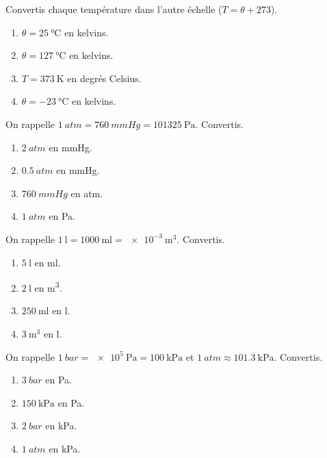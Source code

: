 \documentclass[11pt,a4paper]{article}
\begin{document}
\begin{exo}
Convertis chaque température dans l'autre échelle ($T=\theta+273$).
\begin{enumerate}[label=\alph*)]
  \item $\theta=\qty{25}{\degreeCelsius}$ en kelvins.
  \item $\theta=\qty{127}{\degreeCelsius}$ en kelvins.
  \item $T=\qty{373}{\kelvin}$ en degrés Celsius.
  \item $\theta=\qty{-23}{\degreeCelsius}$ en kelvins.
\end{enumerate}
\end{exo}

\begin{exo}
On rappelle $\qty{1}{atm}=\qty{760}{mmHg}=\qty{101325}{\pascal}$. Convertis.
\begin{enumerate}[label=\alph*)]
  \item $\qty{2}{atm}$ en \si{mmHg}.
  \item $\qty{0.5}{atm}$ en \si{mmHg}.
  \item $\qty{760}{mmHg}$ en \si{atm}.
  \item $\qty{1}{atm}$ en \si{\pascal}.
\end{enumerate}
\end{exo}

\begin{exo}
On rappelle $\qty{1}{\litre}=\qty{1000}{\milli\litre}=\qty{e-3}{\meter\cubed}$. Convertis.
\begin{enumerate}[label=\alph*)]
  \item $\qty{5}{\litre}$ en \si{\milli\litre}.
  \item $\qty{2}{\litre}$ en \si{\meter\cubed}.
  \item $\qty{250}{\milli\litre}$ en \si{\litre}.
  \item $\qty{3}{\meter\cubed}$ en \si{\litre}.
\end{enumerate}
\end{exo}

\begin{exo}
On rappelle $\qty{1}{bar}=\qty{e5}{\pascal}=\qty{100}{\kilo\pascal}$ et
$\qty{1}{atm}\approx\qty{101.3}{\kilo\pascal}$. Convertis.
\begin{enumerate}[label=\alph*)]
  \item $\qty{3}{bar}$ en \si{\pascal}.
  \item $\qty{150}{\kilo\pascal}$ en \si{\pascal}.
  \item $\qty{2}{bar}$ en \si{\kilo\pascal}.
  \item $\qty{1}{atm}$ en \si{\kilo\pascal}.
\end{enumerate}
\end{exo}
\end{document}
